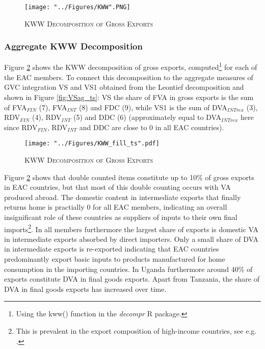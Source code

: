 \documentclass[a4paper]{article}
\begin{document}
\begin{figure}[h!]
\centering
\caption{\label{fig:KWW}\textsc{KWW Decomposition of Gross Exports}}
\texttt{[image: "../Figures/KWW".PNG]} %
\end{figure}
\FloatBarrier

\subsubsection{Aggregate KWW Decomposition}
Figure \ref{fig:KWW_fill_ts} shows the KWW decomposition of gross exports, computed\footnote{Using the kww() function in the \emph{decompr} R package.} for each of the EAC members. To connect this decomposition to the aggregate measures of GVC integration VS and VS1 obtained from the Leontief decomposition and shown in Figure \ref{fig:VSag_ts}: VS the share of FVA in gross exports is the sum of FVA$_{FIN}$ (7), FVA$_{INT}$ (8) and FDC (9), while VS1 is the sum of DVA$_{INTrex}$ (3), RDV$_{FIN}$ (4), RDV$_{INT}$ (5) and DDC (6) (approximately equal to DVA$_{INTrex}$ here since RDV$_{FIN}$, RDV$_{INT}$  and DDC are close to 0 in all EAC countries).  

\begin{figure}[h!]
\centering
\caption{\label{fig:KWW_fill_ts}\textsc{KWW Decomposition of Gross Exports}}
\texttt{[image: "../Figures/KWW\_fill\_ts".pdf]} %
\end{figure}
\FloatBarrier

Figure \ref{fig:KWW_fill_ts} shows that double counted items constitute up to 10\% of gross exports in EAC countries, but that most of this double counting occurs with VA produced abroad. The domestic content in intermediate exports that finally returns home is practially 0 for all EAC members, indicating an overall insignificant role of these countries as suppliers of inputs to their own final imports\footnote{This is prevalent in the export composition of high-income countries, see e.g. \citep{Kummritz20162}.}. In all members furthermore the largest share of exports is domestic VA in intermediate exports absorbed by direct importers. Only a small share of DVA in intermediate exports is re-exported indicating that EAC countries predominantly export basic inputs to products manufactured for home consumption in the importing countries. In Uganda furthermore around 40\% of exports constitute DVA in final goods exports. Apart from Tanzania, the share of DVA in final goods exports has increased over time. \newline %
\end{document}
